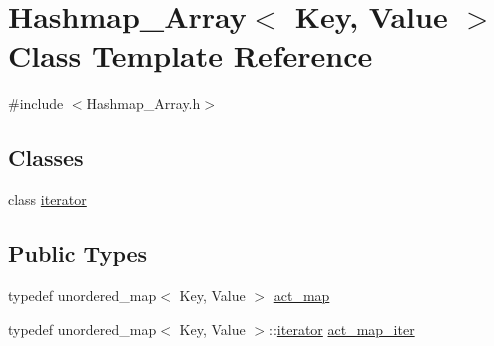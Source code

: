 \hypertarget{class_hashmap___array}{
\section{Hashmap\_\-Array$<$ Key, Value $>$ Class Template Reference}
\label{class_hashmap___array}
}


{\ttfamily \#include $<$Hashmap\_\-Array.h$>$}

\subsection*{Classes}
\begin{DoxyCompactItemize}
\item 
class \hyperlink{class_hashmap___array_1_1iterator}{iterator}
\end{DoxyCompactItemize}
\subsection*{Public Types}
\begin{DoxyCompactItemize}
\item 
typedef unordered\_\-map$<$ Key, Value $>$ \hyperlink{class_hashmap___array_adaad9865d64cbb9488e925a530c03786}{act\_\-map}
\item 
typedef unordered\_\-map$<$ Key, Value $>$::\hyperlink{class_hashmap___array_1_1iterator}{iterator} \hyperlink{class_hashmap___array_a0aaeec502621b4c78da9115c26797a64}{act\_\-map\_\-iter}
\end{DoxyCompactItemize}
